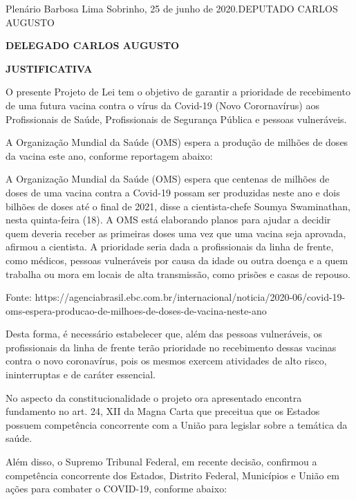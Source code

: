 \documentclass[10pt]{article}
\begin{document}
\begin{center}
  Plenário Barbosa Lima Sobrinho, 25 de junho de 2020.DEPUTADO CARLOS AUGUSTO

   \bigskip

  \textbf{ DELEGADO CARLOS AUGUSTO}

  \bigskip

  \textbf{JUSTIFICATIVA}
  \bigskip

\end{center}

  O presente Projeto de Lei tem o objetivo de garantir a prioridade de recebimento de uma futura vacina contra o vírus da Covid-19 (Novo Corornavírus) aos Profissionais de Saúde, Profissionais de Segurança Pública e pessoas vulneráveis.

A Organização Mundial da Saúde (OMS) espera a produção de milhões de doses da vacina este ano, conforme reportagem abaixo:


 A Organização Mundial da Saúde (OMS) espera que centenas de milhões de doses de uma vacina contra a Covid-19 possam ser produzidas neste ano e dois bilhões de doses até o final de 2021, disse a cientista-chefe Soumya Swaminathan, nesta quinta-feira (18).
A OMS está elaborando planos para ajudar a decidir quem deveria receber as primeiras doses uma vez que uma vacina seja aprovada, afirmou a cientista.
A prioridade seria dada a profissionais da linha de frente, como médicos, pessoas vulneráveis por causa da idade ou outra doença e a quem trabalha ou mora em locais de alta transmissão, como prisões e casas de repouso.


Fonte: https://agenciabrasil.ebc.com.br/internacional/noticia/2020-06/covid-19-oms-espera-producao-de-milhoes-de-doses-de-vacina-neste-ano

Desta forma, é necessário estabelecer que, além das pessoas vulneráveis, os profissionais da linha de frente terão prioridade no recebimento dessas vacinas contra o novo coronavírus, pois os mesmos exercem atividades de alto risco, ininterruptas e de caráter essencial.

No aspecto da constitucionalidade o projeto ora apresentado encontra fundamento no art. 24, XII da Magna Carta que preceitua que os Estados possuem competência concorrente com a União para legislar sobre a temática da saúde.

Além disso, o Supremo Tribunal Federal, em recente decisão, confirmou a competência concorrente dos Estados, Distrito Federal, Municípios e União em ações para combater o COVID-19, conforme abaixo:
\end{document}
